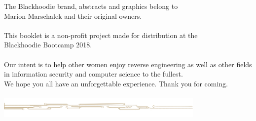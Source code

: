 \def\pagetitletext{}

\thispagestyle{empty}

\vspace*{\fill}
\begin{center}\footnotesize
The Blackhoodie brand, abstracts and graphics belong to\\Marion Marschalek and their original owners.\\
~\\
This booklet is a non-profit project made for distribution at the\\Blackhoodie Bootcamp 2018.\\
~\\
Our intent is to help other women enjoy reverse engineering as well as other fields in information security and computer science to the fullest.\\We hope you all have an unforgettable experience. Thank you for coming.\\
~\\
\includegraphics[height=10mm,keepaspectratio]{images/blackhoodie_div.pdf}
\end{center}
